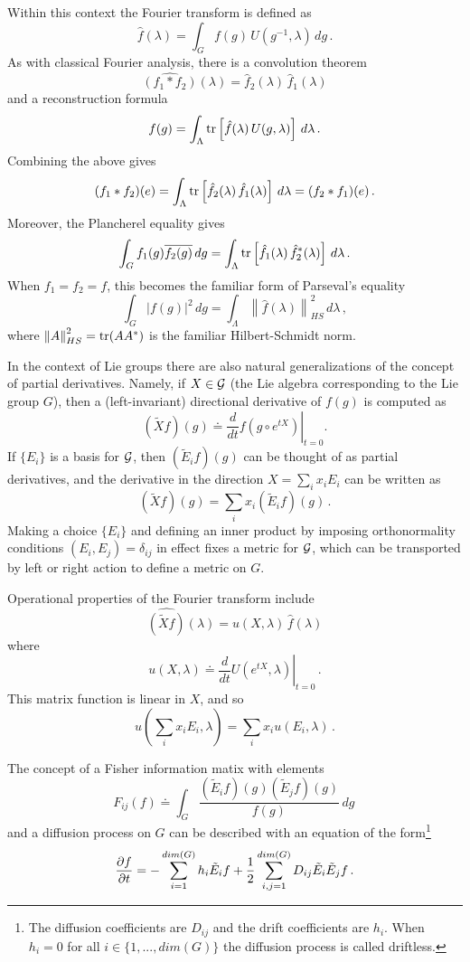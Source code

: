\documentclass{svmult}
\def\half{ {1\over 2} }
\begin{document}
Within this context the Fourier transform is defined as
$$ \hat{f}(\lambda) = \int_{G} f(g)\, U(g^{-1},\lambda) \,dg\,. $$
As with classical Fourier analysis, there is a convolution theorem
$$ \widehat{(f_1 * f_2)}(\lambda) = \hat{f}_2(\lambda) \, \hat{f}_1(\lambda) $$
and a reconstruction formula
$$ f(g) = \int_{\Lambda} {\rm tr}\left[\hat{f}(\lambda) \,U(g,\lambda)\right] \,d\lambda \,. $$
Combining the above gives
$$ (f_1 * f_2)(e) = \int_{\Lambda} {\rm tr}\left[\hat{f}_2(\lambda) \, \hat{f}_1(\lambda) \right] \,d\lambda = (f_2 * f_1)(e) \,. $$
Moreover, the Plancherel equality gives
$$ \int_{G} f_1(g) \overline{f_2(g)} \, dg = \int_{\Lambda} {\rm tr}\left[\hat{f}_1(\lambda)\, \hat{f}_2^*(\lambda) \right] \,d\lambda \,. $$
When $f_1  = f_2  = f$, this becomes the familiar form of Parseval's equality
$$ \int_{G} |f(g)|^2 \, dg = \int_{\Lambda} \left\|\hat{f}(\lambda) \right\|_{HS}^{2} \,d\lambda \,, $$
where $\left\|A\right\|_{HS}^{2} = {\rm tr}(AA^*)$ is the familiar
Hilbert-Schmidt norm.

In the context of Lie groups there are also natural generalizations of the
concept of partial derivatives. Namely, if $X \in {\cal G}$ (the Lie algebra
corresponding to the Lie group $G$), then a (left-invariant) directional derivative of $f(g)$ is computed as
$$ (\tilde{X}f)(g) \doteq \left.\frac{d}{dt} f\left(g \circ e^{tX}\right)\right|_{t=0}. $$
If $\{E_i\}$ is a basis for ${\cal G}$, then $(\tilde{E}_i f)(g)$ can be thought
of as partial derivatives, and the derivative in the direction $X = \sum_i x_i E_i$ can be
written as
$$ (\tilde{X}f)(g) = \sum_i x_i (\tilde{E}_if)(g)\,. $$
Making a choice $\{E_i\}$ and defining an inner product by imposing orthonormality
conditions $(E_i,E_j) = \delta_{ij}$ in effect fixes a metric for $\cal{G}$, which can be
transported by left or right action to define a metric on $G$.

Operational properties of the Fourier transform include
$$ \widehat{(\tilde{X}f)}(\lambda) =  u(X,\lambda) \, \hat{f}(\lambda) $$
where
$$ u(X,\lambda) \doteq \left.\frac{d}{dt} U(e^{tX},\lambda)\right|_{t=0}\,. $$
This matrix function is linear in $X$, and so
$$ u\left(\sum_i x_i E_i,\lambda\right) = \sum_i x_i u(E_i,\lambda)\,. $$

The concept of a Fisher information matix
with elements
$$ F_{ij}(f) \doteq \int_G \frac{(\tilde{E}_i f)(g) (\tilde{E}_j f)(g)}{f(g)} \,dg\, $$
and a diffusion process on $G$ can be described with an equation of the form\footnote{The diffusion coefficients
are $D_{ij}$ and the drift coefficients are $h_i$. When $h_i=0$ for all $i \in \{1,...,dim(G)\}$ the diffusion process is called driftless.}
\begin{equation}
\frac{\partial f}{\partial t} = -\sum_{i=1}^{dim(G)} h_{i} \tilde{E}_i f
+ \half \sum_{i,j=1}^{dim(G)} D_{ij} \tilde{E}_i \tilde{E}_j f \,.
\label{mainmo}
\end{equation}
\end{document}
